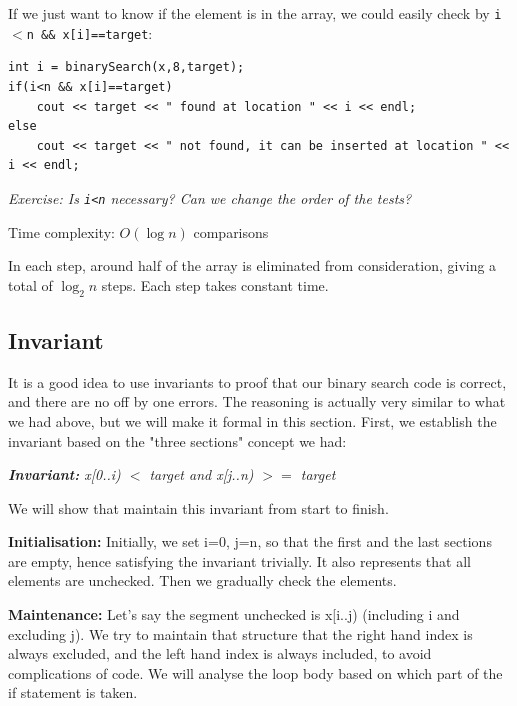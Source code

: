 If we just want to know if the element is in the array, we could easily check by \texttt{i$<$n \&\& x[i]==target}:

\begin{lstlisting}
int i = binarySearch(x,8,target);
if(i<n && x[i]==target)
    cout << target << " found at location " << i << endl;
else 
    cout << target << " not found, it can be inserted at location " << i << endl;
\end{lstlisting}

\textit{Exercise: Is \texttt{i<n} necessary? Can we change the order of the tests?}
\vspace{6mm}

Time complexity: $O(\log n)$ comparisons
\vspace{6mm}

In each step, around half of the array is eliminated from consideration, giving a total of $\log_2 n$ steps. Each step takes constant time.

\if{}

\subsection*{Invariant}

It is a good idea to use invariants to proof that our binary search code is correct, and there are no off by one errors. The reasoning is actually very similar to what we had above, but we will make it formal in this section. First, we establish the invariant based on the "three sections" concept we had: 

\begin{center}
    \textit{\textbf{Invariant:}\hspace{6mm} x[0..i) $<$ target and x[j..n) $>=$ target}
\end{center}

We will show that maintain this invariant from start to finish. 

\textbf{Initialisation:} Initially, we set i=0, j=n, so that the first and the last sections are empty, hence satisfying the invariant trivially. It also represents that all elements are unchecked. Then we gradually check the elements.
\vspace{6mm}

\textbf{Maintenance:} Let's say the segment unchecked is x[i..j) (including i and excluding j). We try to maintain that structure that the right hand index is always excluded, and the left hand index is always included, to avoid complications of code. We will analyse the loop body based on which part of the if statement is taken.


